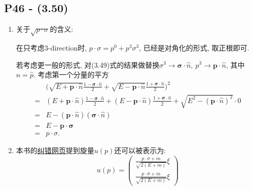 \subsection{P46 - (3.50)}

\begin{enumerate}
  \item \textbf{}关于$\sqrt{p\cdot \sigma}$的含义:

        在只考虑3-direction时, $p\cdot \sigma = p^0 + p^3\sigma^3$, 已经是对角化的形式, 取正根即可.

        若考虑更一般的形式, 对(3.49)式的结果做替换$\sigma^3 \rightarrow \bm{\sigma}\cdot\hat{n},\ p^3 \rightarrow \mathbf{p}\cdot\hat{n}$, 其中$\hat{n} = \hat{p}$.
        考虑第一个分量的平方
        \begin{equation}
          \begin{aligned}
              & \biggl(\sqrt{E+\mathbf{p}\cdot\hat{n}} \frac{1-\bm{\sigma}\cdot\hat{n}}{2} + \sqrt{E-\mathbf{p}\cdot\hat{n}} \frac{1+\bm{\sigma}\cdot\hat{n}}{2} \biggr)^2                        \\
            = & (E+\mathbf{p}\cdot\hat{n}) \frac{1-\bm{\sigma}\cdot\hat{n}}{2} + (E-\mathbf{p}\cdot\hat{n}) \frac{1+\bm{\sigma}\cdot\hat{n}}{2} + \sqrt{E^2 - (\mathbf{p}\cdot\hat{n})^2} \cdot 0 \\
            = & E - (\mathbf{p}\cdot\hat{n})(\bm{\sigma}\cdot\hat{n})                                                                                                                             \\
            = & E - \mathbf{p} \cdot \bm{\sigma}                                                                                                                                                  \\
            = & p \cdot \sigma .
          \end{aligned}
        \end{equation}
  \item \textbf{}本书的\href{https://www.slac.stanford.edu/~mpeskin/QFT.html}{纠错网页}提到旋量$u(p)$还可以被表示为:
        \begin{equation}\label{eq: spinor_explicit(ch.3)}
          u(p)=\begin{pmatrix}
            \frac{p\cdot \sigma + m}{\sqrt{2(E+m)}}\xi \\
            \frac{p\cdot \bar{\sigma} + m}{\sqrt{2(E+m)}}\xi
          \end{pmatrix}
        \end{equation}


\end{enumerate}
